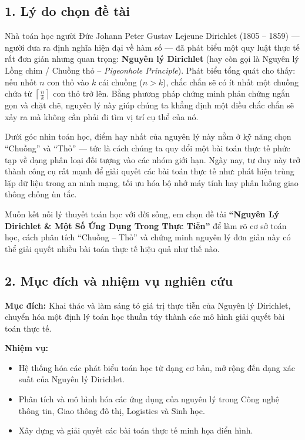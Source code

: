 \documentclass[12pt,a4paper]{article}
\theoremstyle{definition}
\begin{document}
\subsection*{1. Lý do chọn đề tài}
Nhà toán học người Đức Johann Peter Gustav Lejeune Dirichlet (1805 -- 1859) --- người đưa ra định nghĩa hiện đại về hàm số --- đã phát biểu một quy luật thực tế rất đơn giản nhưng quan trọng: \textbf{Nguyên lý Dirichlet} (hay còn gọi là Nguyên lý Lồng chim / Chuồng thỏ -- \textit{Pigeonhole Principle}). Phát biểu tổng quát cho thấy: nếu nhốt $n$ con thỏ vào $k$ cái chuồng ($n > k$), chắc chắn sẽ có ít nhất một chuồng chứa từ $\left\lceil \frac{n}{k} \right\rceil$ con thỏ trở lên. Bằng phương pháp chứng minh phản chứng ngắn gọn và chặt chẽ, nguyên lý này giúp chúng ta khẳng định một điều chắc chắn sẽ xảy ra mà không cần phải đi tìm vị trí cụ thể của nó.

Dưới góc nhìn toán học, điểm hay nhất của nguyên lý này nằm ở kỹ năng chọn ``Chuồng'' và ``Thỏ'' --- tức là cách chúng ta quy đổi một bài toán thực tế phức tạp về dạng phân loại đối tượng vào các nhóm giới hạn. Ngày nay, tư duy này trở thành công cụ rất mạnh để giải quyết các bài toán thực tế như: phát hiện trùng lặp dữ liệu trong an ninh mạng, tối ưu hóa bộ nhớ máy tính hay phân luồng giao thông chống ùn tắc.

Muốn kết nối lý thuyết toán học với đời sống, em chọn đề tài \textbf{``Nguyên Lý Dirichlet \& Một Số Ứng Dụng Trong Thực Tiễn''} để làm rõ cơ sở toán học, cách phân tích ``Chuồng -- Thỏ'' và chứng minh nguyên lý đơn giản này có thể giải quyết nhiều bài toán thực tế hiệu quả như thế nào.

\subsection*{2. Mục đích và nhiệm vụ nghiên cứu}

\noindent\textbf{Mục đích:} Khai thác và làm sáng tỏ giá trị thực tiễn của Nguyên lý Dirichlet, chuyển hóa một định lý toán học thuần túy thành các mô hình giải quyết bài toán thực tế.

\vspace{0.2cm}
\noindent\textbf{Nhiệm vụ:}
\begin{itemize}[leftmargin=1.5cm]
    \item Hệ thống hóa các phát biểu toán học từ dạng cơ bản, mở rộng đến dạng xác suất của Nguyên lý Dirichlet.
    \item Phân tích và mô hình hóa các ứng dụng của nguyên lý trong Công nghệ thông tin, Giao thông đô thị, Logistics và Sinh học.
    \item Xây dựng và giải quyết các bài toán thực tế minh họa điển hình.
\end{itemize}
\end{document}

